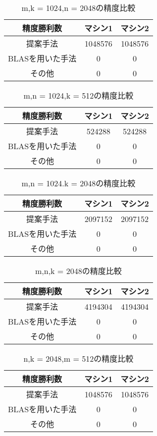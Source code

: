 \documentclass[11pt,a4paper]{jsreport}
\theoremstyle{definition}
\begin{document}
\begin{table}[H]
\centering
\small
\caption{m,k = 1024,n = 2048の精度比較}
\begin{tabular}{c|c|c}
\hline
精度勝利数 & マシン1 & マシン2 \\ \hline \hline
提案手法 & 1048576 & 1048576 \\ \hline
BLASを用いた手法 & 0 & 0  \\ \hline
その他 & 0 & 0 \\ \hline
\end{tabular}
\end{table}

\begin{table}[H]
\centering
\small
\caption{m,n = 1024,k = 512の精度比較}
\begin{tabular}{c|c|c}
\hline
精度勝利数 & マシン1 & マシン2 \\ \hline \hline
提案手法 & 524288 & 524288 \\ \hline
BLASを用いた手法 & 0 & 0  \\ \hline
その他 & 0 & 0 \\  \hline
\end{tabular}
\end{table}

\begin{table}[H]
\centering
\small
\caption{m,n = 1024.k = 2048の精度比較}
\begin{tabular}{c|c|c}
\hline
精度勝利数 & マシン1 & マシン2 \\ \hline \hline
提案手法 & 2097152 & 2097152 \\ \hline
BLASを用いた手法 & 0 & 0  \\ \hline
その他 & 0 & 0 \\ \hline
\end{tabular}
\end{table}

\begin{table}[H]
\centering
\small
\caption{m,n,k = 2048の精度比較}
\begin{tabular}{c|c|c}
\hline
精度勝利数 & マシン1 & マシン2 \\ \hline \hline
提案手法 & 4194304 & 4194304 \\ \hline
BLASを用いた手法 & 0 & 0 \\ \hline
その他 & 0 & 0 \\ \hline
\end{tabular}
\end{table}

\begin{table}[H]
\centering
\small
\caption{n,k = 2048,m = 512の精度比較}
\begin{tabular}{c|c|c}
\hline
精度勝利数 & マシン1 & マシン2 \\ \hline \hline
提案手法 & 1048576 & 1048576 \\ \hline
BLASを用いた手法 & 0 & 0 \\ \hline
その他 & 0 & 0 \\ \hline
\end{tabular}
\end{table}
\end{document}
